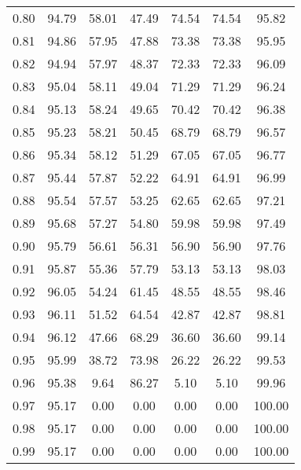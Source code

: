 \begin{tabular}{|c|c|c|c|c|c|c|}
      0.80 &     94.79 &     58.01 &      47.49 &   74.54 &      74.54 &         95.82 \\
      0.81 &     94.86 &     57.95 &      47.88 &   73.38 &      73.38 &         95.95 \\
      0.82 &     94.94 &     57.97 &      48.37 &   72.33 &      72.33 &         96.09 \\
      0.83 &     95.04 &     58.11 &      49.04 &   71.29 &      71.29 &         96.24 \\
      0.84 &     95.13 &     58.24 &      49.65 &   70.42 &      70.42 &         96.38 \\
      0.85 &     95.23 &     58.21 &      50.45 &   68.79 &      68.79 &         96.57 \\
      0.86 &     95.34 &     58.12 &      51.29 &   67.05 &      67.05 &         96.77 \\
      0.87 &     95.44 &     57.87 &      52.22 &   64.91 &      64.91 &         96.99 \\
      0.88 &     95.54 &     57.57 &      53.25 &   62.65 &      62.65 &         97.21 \\
      0.89 &     95.68 &     57.27 &      54.80 &   59.98 &      59.98 &         97.49 \\
      0.90 &     95.79 &     56.61 &      56.31 &   56.90 &      56.90 &         97.76 \\
      0.91 &     95.87 &     55.36 &      57.79 &   53.13 &      53.13 &         98.03 \\
      0.92 &     96.05 &     54.24 &      61.45 &   48.55 &      48.55 &         98.46 \\
      0.93 &     96.11 &     51.52 &      64.54 &   42.87 &      42.87 &         98.81 \\
      0.94 &     96.12 &     47.66 &      68.29 &   36.60 &      36.60 &         99.14 \\
      0.95 &     95.99 &     38.72 &      73.98 &   26.22 &      26.22 &         99.53 \\
      0.96 &     95.38 &      9.64 &      86.27 &    5.10 &       5.10 &         99.96 \\
      0.97 &     95.17 &      0.00 &       0.00 &    0.00 &       0.00 &        100.00 \\
      0.98 &     95.17 &      0.00 &       0.00 &    0.00 &       0.00 &        100.00 \\
      0.99 &     95.17 &      0.00 &       0.00 &    0.00 &       0.00 &        100.00 \\
\bottomrule
\end{tabular}
